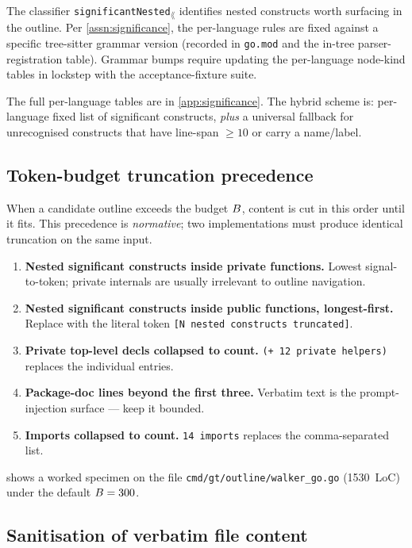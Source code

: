The classifier \texttt{significantNested}$_\lang$ identifies nested
constructs worth surfacing in the outline. Per
\cref{assn:significance}, the per-language rules are fixed against a
specific tree-sitter grammar version (recorded in \texttt{go.mod}
and the in-tree parser-registration table). Grammar bumps require
updating the per-language node-kind tables in lockstep with the
acceptance-fixture suite.

The full per-language tables are in \cref{app:significance}. The
hybrid scheme is: per-language fixed list of significant constructs,
\emph{plus} a universal fallback for unrecognised constructs that have
line-span $\geq 10$ or carry a name/label.

\subsection{Token-budget truncation precedence}
\label{sec:algorithm:truncation}

When a candidate outline exceeds the budget $B$, content is cut
in this order until it fits. This precedence is \emph{normative}; two
implementations must produce identical truncation on the same input.

\begin{enumerate}[leftmargin=*]
  \item \textbf{Nested significant constructs inside private
        functions.} Lowest signal-to-token; private internals are
        usually irrelevant to outline navigation.
  \item \textbf{Nested significant constructs inside public functions,
        longest-first.} Replace with the literal token
        \texttt{[N~nested constructs truncated]}.
  \item \textbf{Private top-level decls collapsed to count.}
        \texttt{(+~12 private helpers)} replaces the individual
        entries.
  \item \textbf{Package-doc lines beyond the first three.} Verbatim
        text is the prompt-injection surface --- keep it bounded.
  \item \textbf{Imports collapsed to count.} \texttt{14 imports}
        replaces the comma-separated list.
\end{enumerate}

 shows a worked specimen on the file
\texttt{cmd/gt/outline/walker\_go.go} (1530~LoC) under the default
$B = 300$.

\subsection{Sanitisation of verbatim file content}
\label{sec:algorithm:sanitization}

